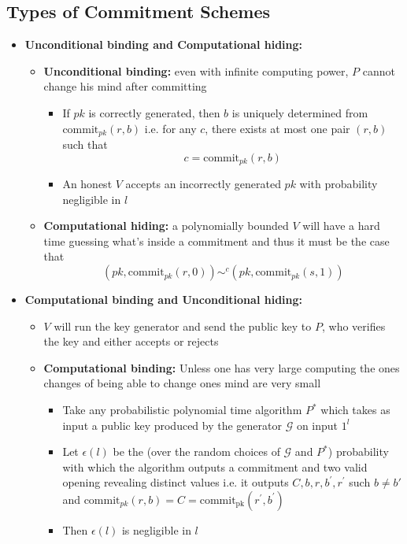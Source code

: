\subsection{Types of Commitment Schemes}
\begin{itemize}
  \item \textbf{Unconditional binding and Computational hiding:}
  \begin{itemize}
    \item \textbf{Unconditional binding:} even with infinite computing power, $P$ cannot change his mind after committing
    \begin{itemize}
      \item If $pk$ is correctly generated, then $b$ is uniquely determined from $\text{commit}_{pk}(r,b)$ i.e. for any $c$, there exists at most one pair $(r,b)$ such that 
      \[
        c = \text{commit}_{pk}(r,b)
      \]
      \item An honest $V$ accepts an incorrectly generated $pk$ with probability negligible in $l$
    \end{itemize}
		\item \textbf{Computational hiding:} a polynomially bounded $V$ will have a hard time guessing what's inside a commitment and thus it must be the case that
    \[
      (pk,\text{commit}_{pk}(r,0)) \sim ^c (pk,\text{commit}_{pk}(s,1))
    \]
  \end{itemize}
  \item \textbf{Computational binding and Unconditional hiding:}
  \begin{itemize}
		\item $V$ will run the key generator and send the public key to $P$, who verifies the key and either accepts or rejects
		\item \textbf{Computational binding:} Unless one has very large computing the ones changes of being able to change ones mind are very small
    \begin{itemize}
			\item Take any probabilistic polynomial time algorithm $P^*$ which takes as input a public key produced by the generator $\mathcal G$ on input $1^l$
			\item Let $\epsilon (l)$ be the (over the random choices of $\mathcal G$ and $P^*$) probability with which the algorithm outputs a commitment and two valid opening revealing distinct values i.e. it outputs $C, b,r,b^{'}, r^{'}$ such $b\ne b'$ and $\text{commit}_{pk} (r,b) = C = \text{commit}_\text{pk}(r^{'},b^{'})$
			\item Then $\epsilon(l)$ is negligible in $l$ 

\end{itemize}
\end{itemize}
\end{itemize}
